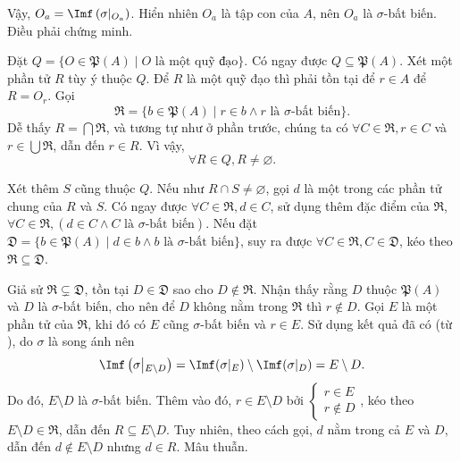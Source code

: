 Vậy, $O_a = \Imf\left(\sigma\middle|_{O_a}\right)$. Hiển nhiên $O_a$ là tập con của $A$, nên $O_a$ là $\sigma$-bất biến. Điều phải chứng minh.

\stepSubexercise Đặt $Q = \{O \in \mathfrak{P}(A) \mid O \text{~là một quỹ đạo}\}$. Có ngay được $Q \subseteq \mathfrak{P}(A)$. Xét một phần tử $R$ tùy ý thuộc $Q$. Để $R$ là một quỹ đạo thì phải tồn tại để $r \in A$ để $R = O_r$. Gọi \begin{equation*}
   \mathfrak{R} = \{b \in \mathfrak{P}(A) \mid r \in b \land r \text{~là $\sigma$-bất biến}\}.
\end{equation*} Dễ thấy $R = \bigcap \mathfrak{R}$, và tương tự như ở phần trước, chúng ta có $\forall C \in \mathfrak{R}, r \in C$ và $r \in \bigcup \mathfrak{R}$, dẫn đến $r \in R$. Vì vậy, \begin{equation*}
   \forall R \in Q, R \neq \varnothing.
\end{equation*}

Xét thêm $S$ cũng thuộc $Q$. Nếu như $R \cap S \neq \varnothing$, gọi $d$ là một trong các phần tử chung của $R$ và $S$. Có ngay được $\forall C \in \mathfrak{R}, d \in C$, sử dụng thêm đặc điểm của $\mathfrak{R}$, $\forall C \in \mathfrak{R}, (d \in C \land C \text{~là $\sigma$-bất biến})$. Nếu đặt $\mathfrak{D} = \{b \in \mathfrak{P}(A) \mid d \in b \land b\text{~là $\sigma$-bất biến}\}$, suy ra được $\forall C \in \mathfrak{R}, C \in \mathfrak{D}$, kéo theo $\mathfrak{R} \subseteq \mathfrak{D}$.

Giả sử $\mathfrak{R} \subsetneq \mathfrak{D}$, tồn tại $D \in \mathfrak{D}$ sao cho $D \notin \mathfrak{R}$. Nhận thấy rằng $D$ thuộc $\mathfrak{P}(A)$ và $D$ là $\sigma$-bất biến, cho nên để $D$ không nằm trong $\mathfrak{R}$ thì $r \notin D$. Gọi $E$ là một phần tử của $\mathfrak{R}$, khi đó có $E$ cũng $\sigma$-bất biến và $r \in E$. Sử dụng kết quả đã có (từ ), do $\sigma$ là song ánh nên
\begin{equation*}
   \Imf\left(\sigma \middle|_{E\setminus D}\right) = \Imf(\sigma|_E) \setminus \Imf(\sigma|_D) = E \setminus D.
\end{equation*}
Do đó, $E \setminus D$ là $\sigma$-bất biến. Thêm vào đó, $r \in E\setminus D$ bởi $\begin{cases}
   r \in E \\
   r \notin D
\end{cases}$, kéo theo $E \setminus D \in \mathfrak{R}$, dẫn đến $R \subseteq E \setminus D$. Tuy nhiên, theo cách gọi, $d$ nằm trong cả $E$ và $D$, dẫn đến $d \notin E \setminus D$ nhưng $d \in R$. Mâu thuẫn.

